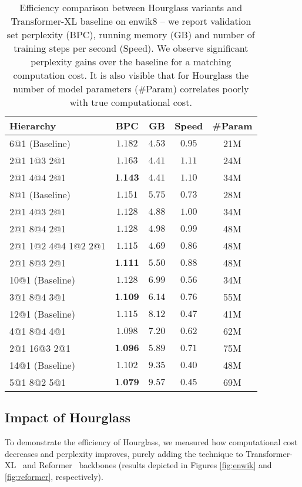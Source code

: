 \documentclass[11pt]{article}
\begin{document}
\begin{table}[ht!]
\small
\centering
\setlength{\tabcolsep}{0.35em}
\begin{tabular}{lcccc}
\hline
Hierarchy & BPC & GB & Speed & \#Param \\
\hline
6@1 (Baseline) & $1.182$ & $4.53$ & $0.95$ & 21M\\
2@1 1@3 2@1 & $1.163$ & $4.41$ & $1.11$ & 24M\\
2@1 4@4 2@1 & $\textbf{1.143}$ & $4.41$ & $1.10$ & 34M\\
\hline
8@1 (Baseline) & $1.151$ & $5.75$ & $0.73$ & 28M\\
2@1 4@3 2@1 & $1.128$ & $4.88$ & $1.00$ & 34M\\
2@1 8@4 2@1 & $1.128$ & $4.98$ & $0.99$ & 48M\\
2@1 1@2 4@4 1@2 2@1 & $1.115$ & $4.69$ & $0.86$ & 48M\\ 
2@1 8@3 2@1 & $\textbf{1.111}$ & $5.50$ & $0.88$ & 48M\\
\hline
10@1 (Baseline) & $1.128$ & $6.99$ & $0.56$ & 34M\\
3@1 8@4 3@1 & $\textbf{1.109}$ & $6.14$ & $0.76$ & 55M\\
\hline
12@1 (Baseline) & $1.115$ & $8.12$ & $0.47$ & 41M\\
4@1 8@4 4@1 & $1.098$ & $7.20$ & $0.62$ & 62M\\
2@1 16@3 2@1 & $\textbf{1.096}$ & $5.89$ & $0.71$ & 75M\\
\hline
14@1 (Baseline) & $1.102$ & $9.35$ & $0.40$ & 48M\\
5@1 8@2 5@1 & $\textbf{1.079}$ & $9.57$ & $0.45$  & 69M\\
\hline
\end{tabular}
\caption{Efficiency comparison between Hourglass variants and Transformer-XL baseline on enwik8 -- we report validation set perplexity (BPC), running memory (GB) and number of training steps per second (Speed). We observe significant perplexity gains over the baseline for a matching computation cost. It is also visible that for Hourglass the number of model parameters (\#Param) correlates poorly with true computational cost. }
\label{tab:memspeed}
\end{table}


\subsection{Impact of Hourglass}\label{sec:hourglassapplication}
To demonstrate the efficiency of Hourglass, we measured how computational cost decreases and perplexity improves, purely adding the technique to Transformer-XL~\cite{dai2019transformerxl} and Reformer~\cite{kitaev2020reformer} backbones (results depicted in Figures \ref{fig:enwik} and \ref{fig:reformer}, respectively).
\end{document}
